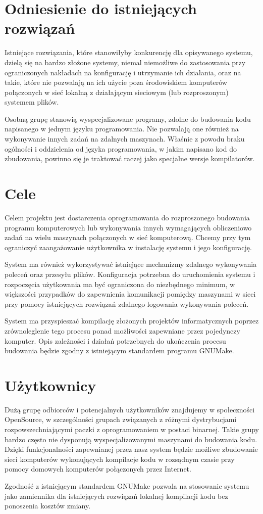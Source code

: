 \documentclass[a4paper]{article}
\begin{document}
\section{Odniesienie do istniejących rozwiązań}

Istniejące rozwiązania, które stanowiłyby konkurencję dla opisywanego systemu, dzielą się na bardzo złożone systemy, niemal niemożliwe do zastosowania przy ograniczonych nakładach na konfigurację i utrzymanie ich działania, oraz na takie, które nie pozwalają na ich użycie poza środowiskiem komputerów połączonych w sieć lokalną z działającym sieciowym (lub rozproszonym) systemem plików.

Osobną grupę stanowią wyspecjalizowane programy, zdolne do budowania kodu napisanego w jednym języku programowania. Nie pozwalają one również na wykonywanie innych zadań na zdalnych maszynach. Właśnie z powodu braku ogólności i oddzielenia od języka programowania, w jakim napisano kod do zbudowania, powinno się je traktować raczej jako specjalne wersje kompilatorów.

\section{Cele}

Celem projektu jest dostarczenia oprogramowania do rozproszonego budowania programu komputerowych lub wykonywania innych wymagających obliczeniowo zadań na wielu maszynach połączonych w sieć komputerową. Chcemy przy tym ograniczyć zaangażowanie użytkownika w instalację systemu i jego konfigurację.

System ma również wykorzystywać istniejące mechanizmy zdalnego wykonywania poleceń oraz przesyłu plików. Konfiguracja potrzebna do uruchomienia systemu i rozpoczęcia użytkowania ma być ograniczona do niezbędnego minimum, w większości przypadków do zapewnienia komunikacji pomiędzy maszynami w sieci przy pomocy istniejących rozwiązań zdalnego logowania wykonywania poleceń.

System ma przyspieszać kompilację złożonych projektów informatycznych poprzez zrównoleglenie tego procesu ponad możliwości zapewniane przez pojedynczy komputer. Opis zależności i działań potrzebnych do ukończenia procesu budowania będzie zgodny z istniejącym standardem programu GNUMake.

\section{Użytkownicy}

Dużą grupę odbiorców i potencjalnych użytkowników znajdujemy w społeczności OpenSource, w szczególności grupach związanych z różnymi dystrybucjami rozpowszechniającymi paczki z oprogramowaniem w postaci binarnej. Takie grupy bardzo często nie dysponują wyspecjalizowanymi maszynami do budowania kodu. Dzięki funkcjonalności zapewnianej przez nasz system będzie możliwe zbudowanie sieci komputerów wykonujących kompilacje kodu w rozsądnym czasie przy pomocy domowych komputerów połączonych przez Internet.

Zgodność z istniejącym standardem GNUMake pozwala na stosowanie systemu jako zamiennika dla istniejących rozwiązań lokalnej kompilacji kodu bez ponoszenia kosztów zmiany.
\end{document}
